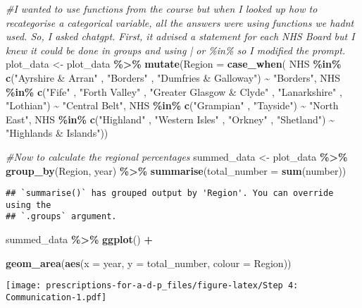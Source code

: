 \documentclass[
]{article}
\newenvironment{Shaded}{\begin{snugshade}}{\end{snugshade}}
\newcommand{\AttributeTok}[1]{\textcolor[rgb]{0.13,0.29,0.53}{#1}}
\newcommand{\CommentTok}[1]{\textcolor[rgb]{0.56,0.35,0.01}{\textit{#1}}}
\newcommand{\FunctionTok}[1]{\textcolor[rgb]{0.13,0.29,0.53}{\textbf{#1}}}
\newcommand{\NormalTok}[1]{#1}
\newcommand{\OtherTok}[1]{\textcolor[rgb]{0.56,0.35,0.01}{#1}}
\newcommand{\SpecialCharTok}[1]{\textcolor[rgb]{0.81,0.36,0.00}{\textbf{#1}}}
\newcommand{\StringTok}[1]{\textcolor[rgb]{0.31,0.60,0.02}{#1}}
\begin{document}
\begin{Shaded}
\begin{Highlighting}[]
\CommentTok{\#I wanted to use functions from the course but when I looked up how to recategorise a categorical variable, all the answers were using functions we hadn\textquotesingle{}t used. So, I asked chatgpt. First, it advised a statement for each NHS Board but I knew it could be done in groups and using | or \%in\% so I modified the prompt. }
\NormalTok{plot\_data }\OtherTok{\textless{}{-}}\NormalTok{ plot\_data }\SpecialCharTok{\%\textgreater{}\%} 
  \FunctionTok{mutate}\NormalTok{(}\AttributeTok{Region =} \FunctionTok{case\_when}\NormalTok{(}
\NormalTok{    NHS }\SpecialCharTok{\%in\%} \FunctionTok{c}\NormalTok{(}\StringTok{"Ayrshire \& Arran"}\NormalTok{ , }\StringTok{"Borders"}\NormalTok{ , }\StringTok{"Dumfries \& Galloway"}\NormalTok{) }\SpecialCharTok{\textasciitilde{}} \StringTok{"Borders"}\NormalTok{,}
\NormalTok{    NHS }\SpecialCharTok{\%in\%} \FunctionTok{c}\NormalTok{(}\StringTok{"Fife"}\NormalTok{ , }\StringTok{"Forth Valley"}\NormalTok{ , }\StringTok{"Greater Glasgow \& Clyde"}\NormalTok{ , }\StringTok{"Lanarkshire"}\NormalTok{ , }\StringTok{"Lothian"}\NormalTok{) }\SpecialCharTok{\textasciitilde{}} \StringTok{"Central Belt"}\NormalTok{,}
\NormalTok{    NHS }\SpecialCharTok{\%in\%} \FunctionTok{c}\NormalTok{(}\StringTok{"Grampian"}\NormalTok{ , }\StringTok{"Tayside"}\NormalTok{) }\SpecialCharTok{\textasciitilde{}} \StringTok{"North East"}\NormalTok{,}
\NormalTok{    NHS }\SpecialCharTok{\%in\%} \FunctionTok{c}\NormalTok{(}\StringTok{"Highland"}\NormalTok{ , }\StringTok{"Western Isles"}\NormalTok{ , }\StringTok{"Orkney"}\NormalTok{ , }\StringTok{"Shetland"}\NormalTok{) }\SpecialCharTok{\textasciitilde{}} \StringTok{"Highlands \& Islands"}\NormalTok{))}

\CommentTok{\#Now to calculate the regional percentages}
\NormalTok{summed\_data }\OtherTok{\textless{}{-}}\NormalTok{ plot\_data }\SpecialCharTok{\%\textgreater{}\%} 
  \FunctionTok{group\_by}\NormalTok{(Region, year) }\SpecialCharTok{\%\textgreater{}\%} 
  \FunctionTok{summarise}\NormalTok{(}\AttributeTok{total\_number =} \FunctionTok{sum}\NormalTok{(number))}
\end{Highlighting}
\end{Shaded}

\begin{verbatim}
## `summarise()` has grouped output by 'Region'. You can override using the
## `.groups` argument.
\end{verbatim}

\begin{Shaded}
\begin{Highlighting}[]
\NormalTok{summed\_data }\SpecialCharTok{\%\textgreater{}\%} 
  \FunctionTok{ggplot}\NormalTok{() }\SpecialCharTok{+}
  
  \FunctionTok{geom\_area}\NormalTok{(}\FunctionTok{aes}\NormalTok{(}\AttributeTok{x =}\NormalTok{ year, }\AttributeTok{y =}\NormalTok{ total\_number, }\AttributeTok{colour =}\NormalTok{ Region))}
\end{Highlighting}
\end{Shaded}

\texttt{[image: prescriptions-for-a-d-p\_files/figure-latex/Step 4: Communication-1.pdf]}
\end{document}
